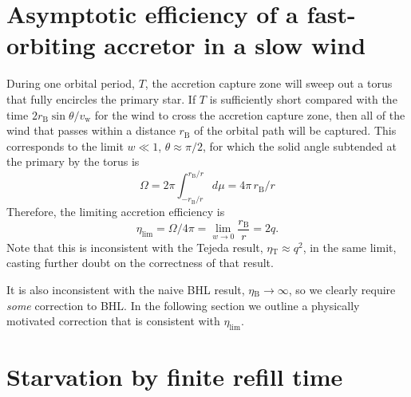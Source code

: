 \documentclass[useAMS, usenatbib, a4paper]{mnras}
\newcommand\wind{\ensuremath{_{\mathrm{w}}}}
\newcommand\bhl{\ensuremath{_{\mathrm{\scriptscriptstyle B}}}}
\newcommand\Tej{\ensuremath{_{\mathrm{\scriptscriptstyle T}}}}
\begin{document}
\section{Asymptotic efficiency of a fast-orbiting accretor in a slow wind}
\label{sec:fast-orbit-accr}

During one orbital period, \(T\),
the accretion capture zone will sweep out a torus that
fully encircles the primary star.
If \(T\) is sufficiently short compared with the time \(2 r\bhl \sin \theta / v\wind\) for the wind to cross the accretion capture zone, then all of the wind that passes within
a distance \(r\bhl\) of the orbital path will be captured.
This corresponds to the limit \(w \ll 1\), \(\theta \approx \pi/2\), for which
the solid angle subtended at the primary by the torus is
\begin{equation}
  \label{eq:omega-torus}
  \Omega = 2 \pi \int_{-r\bhl / r}^{r\bhl / r} d\mu = 4 \pi \, r\bhl / r
\end{equation}
Therefore, the limiting accretion efficiency is
\begin{equation}
  \label{eq:1}
  \eta_{\lim} = \Omega / 4\pi = \lim_{w \to 0} \frac{r\bhl}{r} = 2 q .
\end{equation}
Note that this is inconsistent with the Tejeda result,
\(\eta\Tej \approx q^2\), in the same limit, casting further doubt on
the correctness of that result.

It is also inconsistent with the naive BHL result, \(\eta\bhl \to \infty\),
so we clearly require \emph{some} correction to BHL.
In the following section we outline a physically motivated correction
that is consistent with \(\eta_{\lim}\).

\section{Starvation by finite refill time}
\label{sec:starv-finite-refill}
\end{document}
